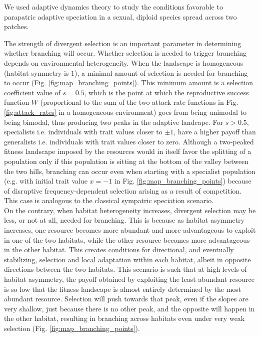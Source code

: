 We used adaptive dynamics theory to study the conditions favorable to parapatric adaptive speciation in a sexual, diploid species spread across two patches. 


The strength of divergent selection is an important parameter in determining whether branching will occur. Whether selection is needed to trigger branching depends on environmental heterogeneity. When the landscape is homogeneous (habitat symmetry  is $1$), a minimal amount of selection is needed for branching to occur (Fig. \ref{fig:map_branching_points}). This minimum amount is a selection coefficient value of $s = 0.5$, which is the point at which the reproductive success function $W$ (proportional to the sum of the two attack rate functions in Fig. \ref{fig:attack_rates} in a homogeneous environment) goes from being unimodal to being bimodal, thus producing two peaks in the adaptive landcape. For $s > 0.5$, specialists i.e. individuals with trait values closer to $\pm 1$, have a higher payoff than generalists i.e. individuals with trait values closer to zero. Although a two-peaked fitness landscape imposed by the resources would in itself favor the splitting of a population only if this population is sitting at the bottom of the valley between the two hills, branching can occur even when starting with a specialist population (e.g. with initial trait value $x = -1$ in Fig. \ref{fig:map_branching_points}) because of disruptive frequency-dependent selection arising as a result of competition. This case is analogous to the classical sympatric speciation scenario.\\


On the contrary, when habitat heterogeneity increases, divergent selection may be less, or not at all, needed for branching. This is because as habitat asymmetry increases, one resource becomes more abundant and more advantageous to exploit in one of the two habitats, while the other resource becomes more advantageous in the other habitat. This creates conditions for directional, and eventually stabilizing, selection and local adaptation within each habitat, albeit in opposite directions between the two habitats. This scenario is such that at high levels of habitat asymmetry, the payoff obtained by exploiting the least abundant resource is so low that the fitness landscape is almost entirely determined by the most abundant resource. Selection will push towards that peak, even if the slopes are very shallow, just because there is no other peak, and the opposite will happen in the other habitat, resulting in branching across habitats even under very weak selection (Fig. \ref{fig:map_branching_points}).\\

